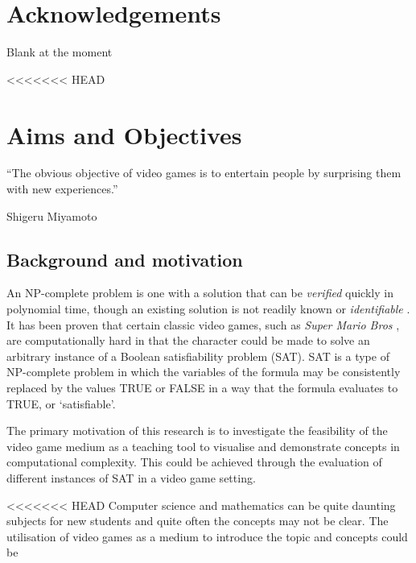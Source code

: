 \documentclass[11pt, a4paper, oneside]{report} %
\begin{document}
\chapter*{Acknowledgements}

Blank at the moment



\tableofcontents




<<<<<<< HEAD
\chapter{Aims and Objectives}

\epigraph{``The obvious objective of video games is to entertain people by
surprising them with new experiences.''}{Shigeru Miyamoto}

\section{Background and motivation}

An NP-complete problem is one with a solution that can be \textit{verified}
quickly in polynomial time, though an existing solution is not readily known or
\textit{identifiable} \cite{cook1984can}. It has been proven that certain
classic video games, such as \textit{Super Mario Bros} \cite{Aloupis2012}, are
computationally hard in that the character could be made to solve an arbitrary
instance of a Boolean satisfiability problem (SAT). SAT is a type of NP-complete
problem in which the variables of the formula may be consistently replaced by
the values TRUE or FALSE in a way that the formula evaluates to TRUE, or
`satisfiable'.

The primary motivation of this research is to investigate the feasibility of the
video game medium as a teaching tool to visualise and demonstrate concepts in
computational complexity. This could be achieved through the evaluation of
different instances of SAT in a video game setting.\@

<<<<<<< HEAD
Computer science and mathematics can be quite daunting subjects for new students
and quite often the concepts may not be clear. The utilisation of video games as
a medium to introduce the topic and concepts could be
\end{document}

